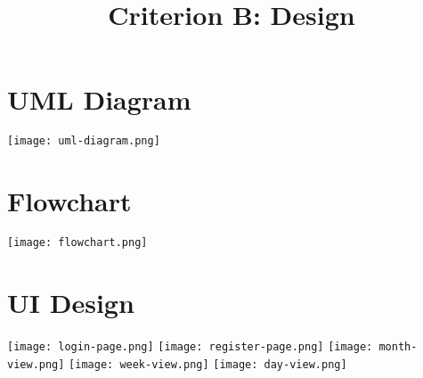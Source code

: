 \documentclass[12pt]{report}
\title{Criterion B: Design}
\begin{document}
\centerline{\textcolor{msblue}{
		\textbf{\fontsize{13}{13}\MyTitle}
	}}

\section*{UML Diagram}
\texttt{[image: uml-diagram.png]}

\section*{Flowchart}
\texttt{[image: flowchart.png]}

\section*{UI Design}
\texttt{[image: login-page.png]}
\texttt{[image: register-page.png]}
\texttt{[image: month-view.png]}
\texttt{[image: week-view.png]}
\texttt{[image: day-view.png]}

\newpage
\end{document}
